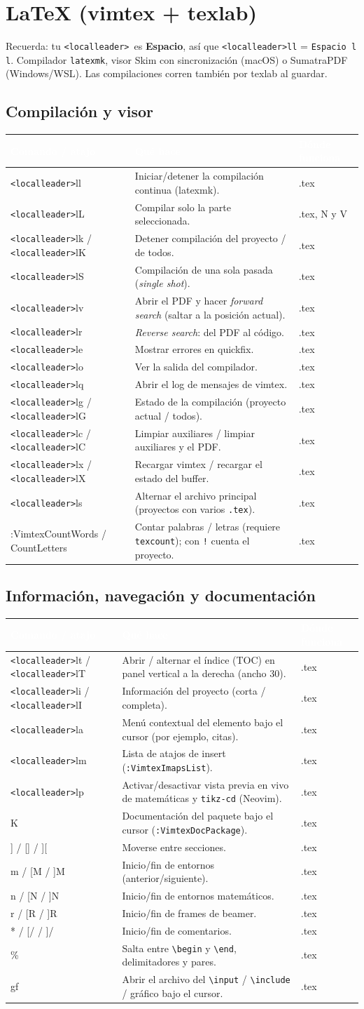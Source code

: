 \documentclass[8pt,a4paper,landscape]{extarticle}
\newcommand{\kk}[1]{\texttt{#1}}
\newcommand{\lld}{\texttt{<localleader>}}
\newcommand{\bs}{\textbackslash{}}
\newenvironment{cht}{%
  \begin{longtable}{>{\raggedright\arraybackslash\ttfamily}p{0.27\textwidth}
                    >{\raggedright\arraybackslash}p{0.46\textwidth}
                    >{\raggedright\arraybackslash}p{0.21\textwidth}}
  \rowcolor{accent}\textcolor{white}{\textbf{\rmfamily Comando / atajo}} &
  \textcolor{white}{\textbf{Qué hace}} & \textcolor{white}{\textbf{Dónde funciona}} \\
  \endhead
}{\end{longtable}}
\newcommand{\rr}[3]{#1 & #2 & #3 \\}
\newcommand{\rg}[3]{\rowcolor{rowgray}\relax #1 & #2 & #3 \\}
\let\oldsubsection\subsection
\renewcommand{\subsection}{\Needspace{9\baselineskip}\oldsubsection}
\let\oldsection\section
\renewcommand{\section}{\Needspace{10\baselineskip}\oldsection}
\begin{document}
\section{LaTeX (vimtex + texlab)}
Recuerda: tu \lld\ es \textbf{Espacio}, así que \kk{\lld ll} = \kk{Espacio l l}. Compilador \kk{latexmk}, visor Skim con sincronización (macOS) o SumatraPDF (Windows/WSL). Las compilaciones corren también por texlab al guardar.

\subsection{Compilación y visor}
\begin{cht}
\rg{\lld ll}{Iniciar/detener la compilación continua (latexmk).}{.tex}
\rr{\lld lL}{Compilar solo la parte seleccionada.}{.tex, N y V}
\rg{\lld lk / \lld lK}{Detener compilación del proyecto / de todos.}{.tex}
\rr{\lld lS}{Compilación de una sola pasada (\emph{single shot}).}{.tex}
\rg{\lld lv}{Abrir el PDF y hacer \emph{forward search} (saltar a la posición actual).}{.tex}
\rr{\lld lr}{\emph{Reverse search}: del PDF al código.}{.tex}
\rg{\lld le}{Mostrar errores en quickfix.}{.tex}
\rr{\lld lo}{Ver la salida del compilador.}{.tex}
\rg{\lld lq}{Abrir el log de mensajes de vimtex.}{.tex}
\rr{\lld lg / \lld lG}{Estado de la compilación (proyecto actual / todos).}{.tex}
\rg{\lld lc / \lld lC}{Limpiar auxiliares / limpiar auxiliares y el PDF.}{.tex}
\rr{\lld lx / \lld lX}{Recargar vimtex / recargar el estado del buffer.}{.tex}
\rg{\lld ls}{Alternar el archivo principal (proyectos con varios \kk{.tex}).}{.tex}
\rr{:VimtexCountWords / CountLetters}{Contar palabras / letras (requiere \kk{texcount}); con \kk{!} cuenta el proyecto.}{.tex}
\end{cht}

\subsection{Información, navegación y documentación}
\begin{cht}
\rg{\lld lt / \lld lT}{Abrir / alternar el índice (TOC) en panel vertical a la derecha (ancho 30).}{.tex}
\rr{\lld li / \lld lI}{Información del proyecto (corta / completa).}{.tex}
\rg{\lld la}{Menú contextual del elemento bajo el cursor (por ejemplo, citas).}{.tex}
\rr{\lld lm}{Lista de atajos de insert (\kk{:VimtexImapsList}).}{.tex}
\rg{\lld lp}{Activar/desactivar vista previa en vivo de matemáticas y \kk{tikz-cd} (Neovim).}{.tex}
\rr{K}{Documentación del paquete bajo el cursor (\kk{:VimtexDocPackage}).}{.tex}
\rg{[[ / ]] / [] / ][}{Moverse entre secciones.}{.tex}
\rr{[m / ]m / [M / ]M}{Inicio/fin de entornos (anterior/siguiente).}{.tex}
\rg{[n / ]n / [N / ]N}{Inicio/fin de entornos matemáticos.}{.tex}
\rr{[r / ]r / [R / ]R}{Inicio/fin de frames de beamer.}{.tex}
\rg{[* / ]* / [/ / ]/}{Inicio/fin de comentarios.}{.tex}
\rr{\%}{Salta entre \kk{\bs begin} y \kk{\bs end}, delimitadores y pares.}{.tex}
\rg{gf}{Abrir el archivo del \kk{\bs input} / \kk{\bs include} / gráfico bajo el cursor.}{.tex}
\end{cht}
\end{document}
